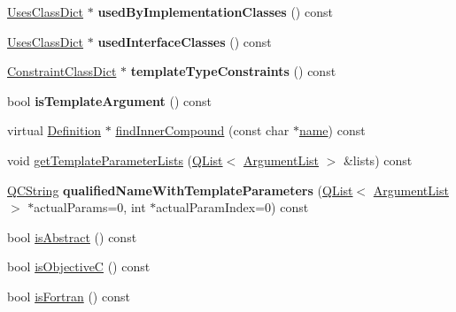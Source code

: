 \begin{DoxyCompactItemize}
\item 
\mbox{\label{class_class_def_acd26bbd4ffab8e7bde10c26a615b1d47}} 
\mbox{\hyperlink{class_uses_class_dict}{Uses\+Class\+Dict}} $\ast$ {\bfseries used\+By\+Implementation\+Classes} () const
\item 
\mbox{\label{class_class_def_a5ab6ba1c4c45c70bd75354bac7e07ad4}} 
\mbox{\hyperlink{class_uses_class_dict}{Uses\+Class\+Dict}} $\ast$ {\bfseries used\+Interface\+Classes} () const
\item 
\mbox{\label{class_class_def_af2832b5abf97a1cbad5b0f686aaefdc3}} 
\mbox{\hyperlink{class_constraint_class_dict}{Constraint\+Class\+Dict}} $\ast$ {\bfseries template\+Type\+Constraints} () const
\item 
\mbox{\label{class_class_def_ae13581aefa2bd5e31b058e949f65a4b4}} 
bool {\bfseries is\+Template\+Argument} () const
\item 
virtual \mbox{\hyperlink{class_definition}{Definition}} $\ast$ \mbox{\hyperlink{class_class_def_a0412b4964163665b778c682fd52f91c4}{find\+Inner\+Compound}} (const char $\ast$\mbox{\hyperlink{class_definition_a9324000f785d7b6b098878a3bca4df5b}{name}}) const
\item 
void \mbox{\hyperlink{class_class_def_ac207abeb9986e58ea9ec4362125e0de2}{get\+Template\+Parameter\+Lists}} (\mbox{\hyperlink{class_q_list}{Q\+List}}$<$ \mbox{\hyperlink{class_argument_list}{Argument\+List}} $>$ \&lists) const
\item 
\mbox{\label{class_class_def_a8a347682d4c7cc04ffc3b77dada01c1e}} 
\mbox{\hyperlink{class_q_c_string}{Q\+C\+String}} {\bfseries qualified\+Name\+With\+Template\+Parameters} (\mbox{\hyperlink{class_q_list}{Q\+List}}$<$ \mbox{\hyperlink{class_argument_list}{Argument\+List}} $>$ $\ast$actual\+Params=0, int $\ast$actual\+Param\+Index=0) const
\item 
bool \mbox{\hyperlink{class_class_def_a9df9236af543d3a00fcf9568994f878a}{is\+Abstract}} () const
\item 
bool \mbox{\hyperlink{class_class_def_a9e0c450e5e90f80705e5011aeda172f5}{is\+ObjectiveC}} () const
\item 
bool \mbox{\hyperlink{class_class_def_a799b9febc429fed874db28d75475ba97}{is\+Fortran}} () const
\item 

\end{DoxyCompactItemize}
